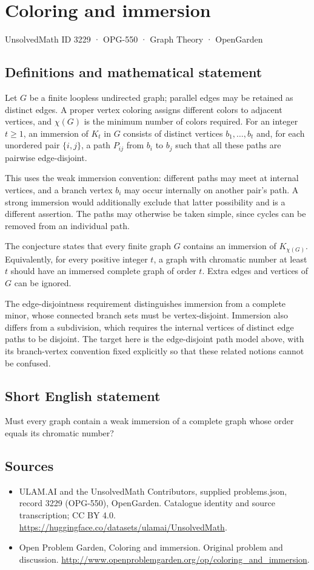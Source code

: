 \documentclass[11pt,a4paper]{article}
\begin{document}
\section*{Coloring and immersion}\label{3229}
{\small UnsolvedMath ID 3229 · OPG-550 · Graph Theory · OpenGarden}
\subsection{Definitions and mathematical statement}
Let $G$ be a finite loopless undirected graph; parallel edges may be retained as distinct edges. A proper vertex coloring assigns different colors to adjacent vertices, and $\chi(G)$ is the minimum number of colors required. For an integer $t\ge1$, an immersion of $K_t$ in $G$ consists of distinct vertices $b_1,\ldots,b_t$ and, for each unordered pair $\{i,j\}$, a path $P_{ij}$ from $b_i$ to $b_j$ such that all these paths are pairwise edge-disjoint.

This uses the weak immersion convention: different paths may meet at internal vertices, and a branch vertex $b_i$ may occur internally on another pair's path. A strong immersion would additionally exclude that latter possibility and is a different assertion. The paths may otherwise be taken simple, since cycles can be removed from an individual path.

The conjecture states that every finite graph $G$ contains an immersion of $K_{\chi(G)}$. Equivalently, for every positive integer $t$, a graph with chromatic number at least $t$ should have an immersed complete graph of order $t$. Extra edges and vertices of $G$ can be ignored.

The edge-disjointness requirement distinguishes immersion from a complete minor, whose connected branch sets must be vertex-disjoint. Immersion also differs from a subdivision, which requires the internal vertices of distinct edge paths to be disjoint. The target here is the edge-disjoint path model above, with its branch-vertex convention fixed explicitly so that these related notions cannot be confused.
\subsection{Short English statement}
Must every graph contain a weak immersion of a complete graph whose order equals its chromatic number?
\subsection{Sources}
\begin{itemize}
\item[S1] ULAM.AI and the UnsolvedMath Contributors, supplied problems.json, record 3229 (OPG-550), OpenGarden. Catalogue identity and source transcription; CC BY 4.0.
\url{https://huggingface.co/datasets/ulamai/UnsolvedMath}.
\item[S2] Open Problem Garden, Coloring and immersion. Original problem and discussion.
\url{http://www.openproblemgarden.org/op/coloring_and_immersion}.
\end{itemize}
\end{document}

